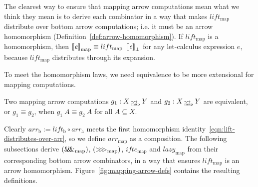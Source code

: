 \documentclass[preprint]{sigplanconf}
\newcommand{\arrow}{\rightsquigarrow}
\newcommand{\arrowlift}{\ensuremath{lift}}
\newcommand{\arrowarr}{\ensuremath{arr}}
\newcommand{\arrowcomp}{\ensuremath{{>}\mspace{-6mu}{>}\mspace{-6mu}{>}}}
\newcommand{\arrowpair}{\ensuremath{\mathit{\&\mspace{-7.5mu}\&\mspace{-7.5mu}\&}}}
\newcommand{\arrowif}{\ensuremath{ifte}}
\newcommand{\arrowlazy}{\ensuremath{lazy}}
\newcommand{\gen}{_\mathrm{a}}
\newcommand{\genb}{_\mathrm{b}}
\newcommand{\map}{_\mathrm{map}}
\DeclareMathOperator{\mapto}{\arrow_{\mspace{-21mu}\map}}
\newcommand{\liftmap}{\arrowlift\map}
\newcommand{\arrmap}{\arrowarr\map}
\newcommand{\compmap}{\arrowcomp\map}
\newcommand{\pairmap}{\arrowpair\map}
\newcommand{\ifmap}{\arrowif\map}
\newcommand{\lazymap}{\arrowlazy\map}
\begin{document}
The clearest way to ensure that mapping arrow computations mean what we think they mean is to derive each combinator in a way that makes $\liftmap$ distribute over bottom arrow computations; i.e. it must be an arrow homomorphism (Definition~\ref{def:arrow-homomorphism}).
If $\liftmap$ is a homomorphism, then $\meaningof{\mathit{e}}\map \equiv \liftmap~\meaningof{\mathit{e}}_\bot$ for any let-calculus expression $\mathit{e}$, because $\liftmap$ distributes through its expansion.

To meet the homomorphism laws, we need equivalence to be more extensional for mapping computations.

\begin{definition}
Two mapping arrow computations $g_1 : X \mapto Y$ and $g_2 : X \mapto Y$ are equivalent, or $g_1 \equiv g_2$, when $g_1~A \equiv g_2~A$ for all $A \subseteq X$.
\end{definition}

Clearly $\arrowarr\genb := lift\genb \circ \arrowarr\gen$ meets the first homomorphism identity~\eqref{eqn:lift-distributes-over-arr}, so we define $\arrmap$ as a composition.
The following subsections derive $(\pairmap)$, $(\compmap)$, $\ifmap$ and $\lazymap$ from their corresponding bottom arrow combinators, in a way that ensures $\liftmap$ is an arrow homomorphism.
Figure~\ref{fig:mapping-arrow-defs} contains the resulting definitions.
\end{document}
